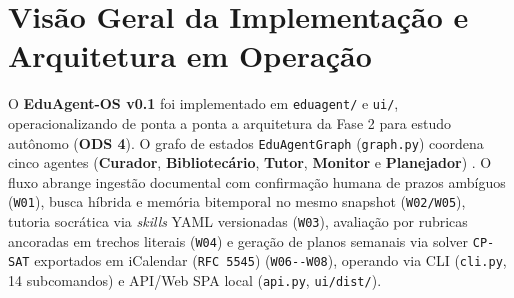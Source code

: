 \documentclass[12pt,a4paper]{article}
\newcommand{\code}[1]{\nolinkurl{#1}}
\begin{document}
\section{Visão Geral da Implementação e Arquitetura em Operação}
\label{sec:visao-geral}


O \textbf{EduAgent-OS v0.1} foi implementado em \code{eduagent/} e \code{ui/}, operacionalizando de ponta a ponta a arquitetura da Fase 2 para estudo autônomo (\textbf{ODS 4}). O grafo de estados \code{EduAgentGraph} (\code{graph.py}) coordena cinco agentes (\textbf{Curador}, \textbf{Bibliotecário}, \textbf{Tutor}, \textbf{Monitor} e \textbf{Planejador}) \cite{hong2024metagpt,sun2025multitutor}. O fluxo abrange ingestão documental com confirmação humana de prazos ambíguos (\code{W01}), busca híbrida e memória bitemporal \cite{packer2023memgpt} no mesmo snapshot (\code{W02/W05}), tutoria socrática via \textit{skills} YAML versionadas \cite{wang2023voyager} (\code{W03}), avaliação por rubricas ancoradas em trechos literais (\code{W04}) e geração de planos semanais via solver \code{CP-SAT} \cite{gou2024tora,google2024cpsat} exportados em iCalendar (\code{RFC 5545}) \cite{desruisseaux2009icalendar} (\code{W06--W08}), operando via CLI (\code{cli.py}, 14 subcomandos) e API/Web SPA local (\code{api.py}, \code{ui/dist/}).
\end{document}
